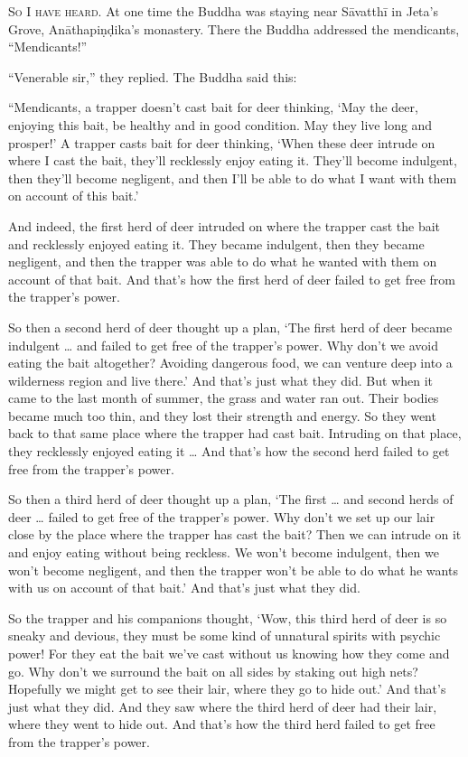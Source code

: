 \documentclass[12pt,openany]{book}%
\newcommand*{\scevam}[1]{\textsc{#1}}
\begin{document}
\scevam{So I have heard. }At one time the Buddha was staying near \textsanskrit{Sāvatthī} in Jeta’s Grove, \textsanskrit{Anāthapiṇḍika}’s monastery. There the Buddha addressed the mendicants, “Mendicants!” 

“Venerable sir,” they replied. The Buddha said this: 

“Mendicants, a trapper doesn’t cast bait for deer thinking, ‘May the deer, enjoying this bait, be healthy and in good condition. May they live long and prosper!’ A trapper casts bait for deer thinking, ‘When these deer intrude on where I cast the bait, they’ll recklessly enjoy eating it. They’ll become indulgent, then they’ll become negligent, and then I’ll be able to do what I want with them on account of this bait.’ 

And indeed, the first herd of deer intruded on where the trapper cast the bait and recklessly enjoyed eating it. They became indulgent, then they became negligent, and then the trapper was able to do what he wanted with them on account of that bait. And that’s how the first herd of deer failed to get free from the trapper’s power. 

So then a second herd of deer thought up a plan, ‘The first herd of deer became indulgent … and failed to get free of the trapper’s power. Why don’t we avoid eating the bait altogether? Avoiding dangerous food, we can venture deep into a wilderness region and live there.’ And that’s just what they did. But when it came to the last month of summer, the grass and water ran out. Their bodies became much too thin, and they lost their strength and energy. So they went back to that same place where the trapper had cast bait. Intruding on that place, they recklessly enjoyed eating it … And that’s how the second herd failed to get free from the trapper’s power. 

So then a third herd of deer thought up a plan, ‘The first … and second herds of deer … failed to get free of the trapper’s power. Why don’t we set up our lair close by the place where the trapper has cast the bait? Then we can intrude on it and enjoy eating without being reckless. We won’t become indulgent, then we won’t become negligent, and then  the trapper won’t be able to do what he wants with us on account of that bait.’ And that’s just what they did. 

So the trapper and his companions thought, ‘Wow, this third herd of deer is so sneaky and devious, they must be some kind of unnatural spirits with psychic power! For they eat the bait we’ve cast without us knowing how they come and go. Why don’t we surround the bait on all sides by staking out high nets? Hopefully we might get to see their lair, where they go to hide out.’ And that’s just what they did. And they saw where the third herd of deer had their lair, where they went to hide out. And that’s how the third herd failed to get free from the trapper’s power. 
\end{document}
